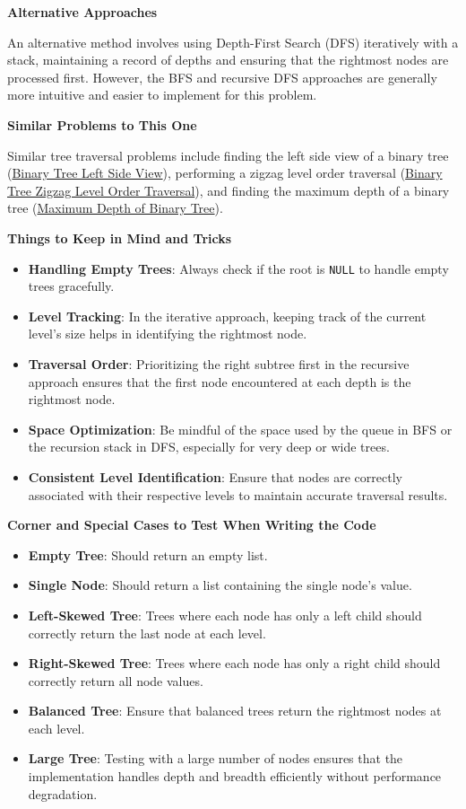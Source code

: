 \textbf{Alternative Approaches}

An alternative method involves using Depth-First Search (DFS) iteratively with a stack, maintaining a record of depths and ensuring that the rightmost nodes are processed first. However, the BFS and recursive DFS approaches are generally more intuitive and easier to implement for this problem.

\textbf{Similar Problems to This One}

Similar tree traversal problems include finding the left side view of a binary tree (\hyperref[problem:binary_tree_left_side_view]{Binary Tree Left Side View}), performing a zigzag level order traversal (\hyperref[problem:binary_tree_zigzag_level_order_traversal]{Binary Tree Zigzag Level Order Traversal}), and finding the maximum depth of a binary tree (\hyperref[problem:maximum_depth_of_binary_tree]{Maximum Depth of Binary Tree}).

\textbf{Things to Keep in Mind and Tricks}

\begin{itemize}
    \item \textbf{Handling Empty Trees}: Always check if the root is \texttt{NULL} to handle empty trees gracefully.
    \item \textbf{Level Tracking}: In the iterative approach, keeping track of the current level's size helps in identifying the rightmost node.
    \item \textbf{Traversal Order}: Prioritizing the right subtree first in the recursive approach ensures that the first node encountered at each depth is the rightmost node.
    \item \textbf{Space Optimization}: Be mindful of the space used by the queue in BFS or the recursion stack in DFS, especially for very deep or wide trees.
    \item \textbf{Consistent Level Identification}: Ensure that nodes are correctly associated with their respective levels to maintain accurate traversal results.
\end{itemize}

\textbf{Corner and Special Cases to Test When Writing the Code}

\begin{itemize}
    \item \textbf{Empty Tree}: Should return an empty list.
    \item \textbf{Single Node}: Should return a list containing the single node's value.
    \item \textbf{Left-Skewed Tree}: Trees where each node has only a left child should correctly return the last node at each level.
    \item \textbf{Right-Skewed Tree}: Trees where each node has only a right child should correctly return all node values.
    \item \textbf{Balanced Tree}: Ensure that balanced trees return the rightmost nodes at each level.
    \item \textbf{Large Tree}: Testing with a large number of nodes ensures that the implementation handles depth and breadth efficiently without performance degradation.
\end{itemize}